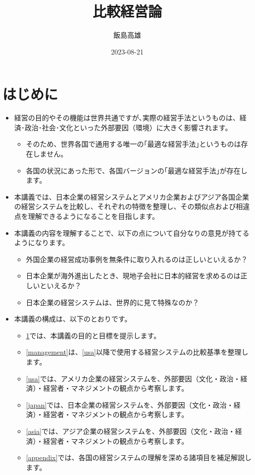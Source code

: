 \documentclass[
]{book}
\title{比較経営論}
\author{飯島高雄}
\date{2023-08-21}
\begin{document}
\maketitle

{
\setcounter{tocdepth}{1}
\tableofcontents
}
\hypertarget{intro}{%
\chapter{はじめに}\label{intro}}

\begin{itemize}
\item
  経営の目的やその機能は世界共通ですが､実際の経営手法というものは、経済･政治･社会･文化といった外部要因（環境）に大きく影響されます。

  \begin{itemize}
  \item
    そのため、世界各国で通用する唯一の｢最適な経営手法｣というものは存在しません。
  \item
    各国の状況にあった形で、各国バージョンの｢最適な経営手法｣が存在します。
  \end{itemize}
\item
  本講義では、日本企業の経営システムとアメリカ企業およびアジア各国企業の経営システムを比較し、それぞれの特徴を整理し、その類似点および相違点を理解できるようになることを目指します。
\item
  本講義の内容を理解することで、以下の点について自分なりの意見が持てるようになります。

  \begin{itemize}
  \item
    外国企業の経営成功事例を無条件に取り入れるのは正しいといえるか？
  \item
    日本企業が海外進出したとき、現地子会社に日本的経営を求めるのは正しいといえるか？
  \item
    日本企業の経営システムは、世界的に見て特殊なのか？
  \end{itemize}
\item
  本講義の構成は、以下のとおりです。

  \begin{itemize}
  \item
    \ref{intro}では、本講義の目的と目標を提示します。
  \item
    \ref{management}は、\ref{usa}以降で使用する経営システムの比較基準を整理します。
  \item
    \ref{usa}では、アメリカ企業の経営システムを、外部要因（文化・政治・経済）・経営者・マネジメントの観点から考察します。
  \item
    \ref{japan}では、日本企業の経営システムを、外部要因（文化・政治・経済）・経営者・マネジメントの観点から考察します。
  \item
    \ref{asia}では、アジア企業の経営システムを、外部要因（文化・政治・経済）・経営者・マネジメントの観点から考察します。
  \item
    \ref{appendix}では、各国の経営システムの理解を深める諸項目を補足解説します。
  \end{itemize}
\end{itemize}
\end{document}
